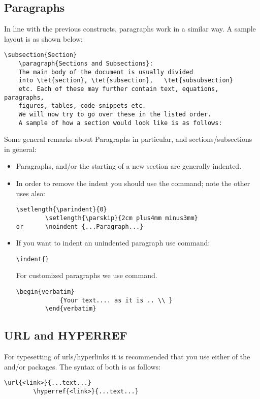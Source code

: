 \subsection{Paragraphs}
In line with the previous constructs, paragraphs work in a similar way. A sample layout is as shown below: \\
\begin{lstlisting}[frame=single]
	\subsection{Section}
	\paragraph{Sections and Subsections}: 
	The main body of the document is usually divided 
	into \tet{section}, \tet{subsection}, 	\tet{subsubsection}
	etc. Each of these may further contain text, equations, paragraphs,
	figures, tables, code-snippets etc. 
	We will now try to go over these in the listed order. 
	A sample of how a section would look like is as follows: 
\end{lstlisting}
Some general remarks about Paragraphs in particular, and sections/subsections in general: 
\begin{itemize}
\item Paragraphs, and/or the starting of a new section are generally indented. 
\item In order to remove the indent you should use the  command; note the other uses also: 
\begin{lstlisting}[frame=single]
		\setlength{\parindent}{0}
		\setlength{\parskip}{2cm plus4mm minus3mm}
or		\noindent {...Paragraph...}
\end{lstlisting}
\item If you want to indent an unindented paragraph use  command: 
\begin{lstlisting}[frame=single]
		\indent{}
\end{lstlisting}
For customized paragraphs we use  command. 
\begin{lstlisting}[frame=single]
		\begin{verbatim}
			{Your text.... as it is .. \\ }
		\end{verbatim}
\end{lstlisting}
\end{itemize}
\subsection{URL and HYPERREF}
For typesetting of urls/hyperlinks it is recommended that you use either of the  and/or  packages. The syntax of both is as follows: \\
\begin{lstlisting}[frame=single]
		\url{<link>}{...text...}
		\hyperref{<link>}{...text...}
\end{lstlisting}

